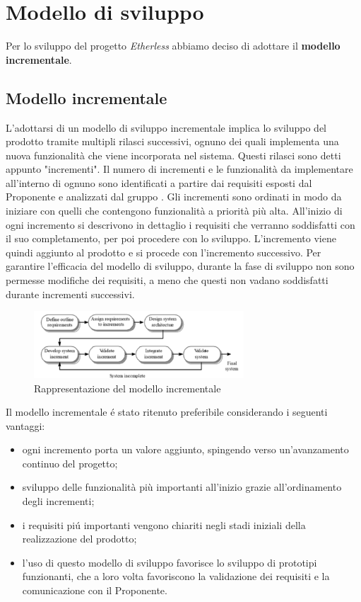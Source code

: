\section{Modello di sviluppo}
Per lo sviluppo del progetto \textit{Etherless} abbiamo deciso di adottare il \textbf{modello incrementale}.
  \subsection{Modello incrementale}
    L'adottarsi di un modello di sviluppo incrementale implica lo sviluppo del prodotto tramite multipli rilasci successivi, ognuno dei quali implementa una nuova funzionalità che viene incorporata nel sistema. Questi rilasci sono detti appunto "incrementi". Il numero di incrementi e le funzionalità da implementare all'interno di ognuno sono identificati a partire dai requisiti esposti dal Proponente e analizzati dal gruppo \Gruppo{}. Gli incrementi sono ordinati in modo da iniziare con quelli che contengono funzionalità a priorità più alta. All'inizio di ogni incremento si descrivono in dettaglio i requisiti che verranno soddisfatti con il suo completamento, per poi procedere con lo sviluppo. L'incremento viene quindi aggiunto al prodotto e si procede con l'incremento successivo. Per garantire l'efficacia del modello di sviluppo, durante la fase di sviluppo non sono permesse modifiche dei requisiti, a meno che questi non vadano soddisfatti durante incrementi successivi.\\
    \begin{figure}[h]
			\centering
			\includegraphics[width=0.7\textwidth]{./res/img/modello_incr.png}
			\caption{Rappresentazione del modello incrementale}
		\end{figure}
    Il modello incrementale é stato ritenuto preferibile considerando i seguenti vantaggi:
    \begin{itemize}
      \item ogni incremento porta un valore aggiunto, spingendo verso un'avanzamento continuo del progetto;
      \item sviluppo delle funzionalità più importanti all'inizio grazie all'ordinamento degli incrementi;
      \item i requisiti piú importanti vengono chiariti negli stadi iniziali della realizzazione del prodotto;
      \item l'uso di questo modello di sviluppo favorisce lo sviluppo di prototipi funzionanti, che a loro volta favoriscono la validazione dei requisiti e la comunicazione con il Proponente.
    \end{itemize}
